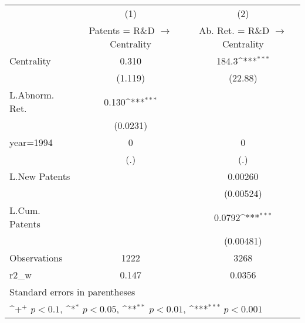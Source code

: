 {
\def\sym#1{\ifmmode^{#1}\else\(^{#1}\)\fi}
\begin{tabular}{l*{2}{c}}
\hline\hline
                    &\multicolumn{1}{c}{(1)}&\multicolumn{1}{c}{(2)}\\
                    &\multicolumn{1}{c}{Patents = R\&D $\rightarrow$ Centrality}&\multicolumn{1}{c}{Ab. Ret. = R\&D $\rightarrow$ Centrality}\\
\hline
Centrality          &       0.310         &       184.3\sym{***}\\
                    &     (1.119)         &     (22.88)         \\
L.Abnorm. Ret.      &       0.130\sym{***}&                     \\
                    &    (0.0231)         &                     \\
year=1994           &           0         &           0         \\
                    &         (.)         &         (.)         \\
L.New Patents       &                     &     0.00260         \\
                    &                     &   (0.00524)         \\
L.Cum. Patents      &                     &      0.0792\sym{***}\\
                    &                     &   (0.00481)         \\
\hline
Observations        &        1222         &        3268         \\
r2\_w                &       0.147         &      0.0356         \\
\hline\hline
\multicolumn{3}{l}{\footnotesize Standard errors in parentheses}\\
\multicolumn{3}{l}{\footnotesize \sym{+} \(p<0.1\), \sym{*} \(p<0.05\), \sym{**} \(p<0.01\), \sym{***} \(p<0.001\)}\\
\end{tabular}
}
